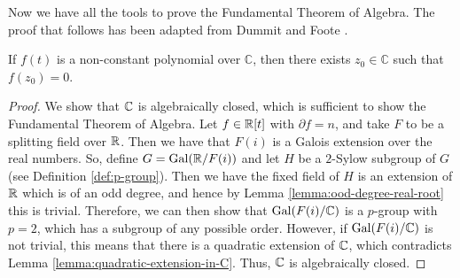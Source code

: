Now we have all the tools to prove the Fundamental Theorem of Algebra. The proof that follows has been adapted from Dummit and Foote \cite{foote-algebra}.

\begin{theorem}
    If $f(t)$ is a non-constant polynomial over $\mathbb{C}$, then there exists $z_0 \in \mathbb{C}$ such that $f\left(z_0\right)=0$.
\end{theorem}

\begin{proof}
    We show that $\mathbb C$ is algebraically closed, which is sufficient to show the Fundamental Theorem of Algebra. Let $f \in \mathbb R[t]$ with $\partial f = n$, and take $F$ to be a splitting field over $\mathbb R$. Then we have that $F(i)$ is a Galois extension over the real numbers. So, define $G=\operatorname{Gal}(\mathbb R/F(i))$ and let $H$ be a $2$-Sylow subgroup of $G$ (see Definition \ref{def:p-group}). Then we have the fixed field of $H$ is an extension of $\mathbb R$ which is of an odd degree, and hence by Lemma \ref{lemma:ood-degree-real-root} this is trivial. Therefore, we can then show that $\operatorname{Gal}(F(i)/\mathbb C)$ is a $p$-group with $p=2$, which has a subgroup of any possible order. However, if $\operatorname{Gal}(F(i)/\mathbb C)$ is not trivial, this means that there is a quadratic extension of $\mathbb C$, which contradicts Lemma \ref{lemma:quadratic-extension-in-C}. Thus, $\mathbb C$ is algebraically closed.
\end{proof}
